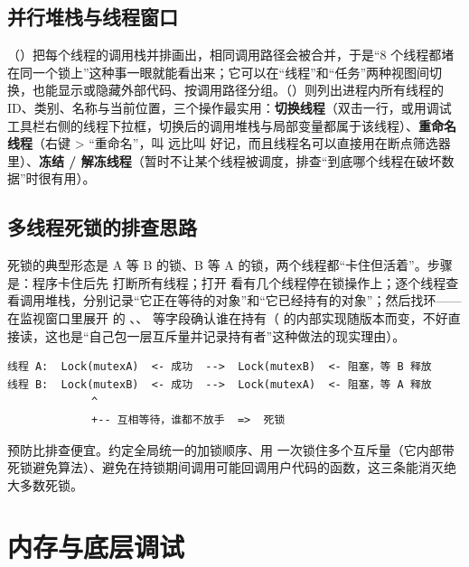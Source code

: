 {\subsection{并行堆栈与线程窗口}

（）把每个线程的调用栈并排画出，相同调用路径会被合并，于是“8 个线程都堵在同一个锁上”这种事一眼就能看出来；它可以在“线程”和“任务”两种视图间切换，也能显示或隐藏外部代码、按调用路径分组。（）则列出进程内所有线程的 ID、类别、名称与当前位置，三个操作最实用：\textbf{切换线程}（双击一行，或用调试工具栏右侧的线程下拉框，切换后的调用堆栈与局部变量都属于该线程）、\textbf{重命名线程}（右键 > “重命名”，叫  远比叫  好记，而且线程名可以直接用在断点筛选器里）、\textbf{冻结 / 解冻线程}（暂时不让某个线程被调度，排查“到底哪个线程在破坏数据”时很有用）。

\subsection{多线程死锁的排查思路}

死锁的典型形态是 A 等 B 的锁、B 等 A 的锁，两个线程都“卡住但活着”。步骤是：程序卡住后先  打断所有线程；打开  看有几个线程停在锁操作上；逐个线程查看调用堆栈，分别记录“它正在等待的对象”和“它已经持有的对象”；然后找环——在监视窗口里展开  的 、、 等字段确认谁在持有（ 的内部实现随版本而变，不好直接读，这也是“自己包一层互斥量并记录持有者”这种做法的现实理由）。

\begin{lstlisting}[style=textstyle]
线程 A:  Lock(mutexA)  <- 成功  -->  Lock(mutexB)  <- 阻塞，等 B 释放
线程 B:  Lock(mutexB)  <- 成功  -->  Lock(mutexA)  <- 阻塞，等 A 释放
             ^
             +-- 互相等待，谁都不放手  =>  死锁
\end{lstlisting}
\begin{tipbox}[提示]
预防比排查便宜。约定全局统一的加锁顺序、用  一次锁住多个互斥量（它内部带死锁避免算法）、避免在持锁期间调用可能回调用户代码的函数，这三条能消灭绝大多数死锁。
\end{tipbox}

\section{内存与底层调试}

}

